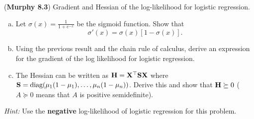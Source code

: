 \documentclass[12pt,letterpaper]{hmcpset}
\begin{document}
\begin{problem}[1]
	(\textbf{Murphy 8.3}) Gradient and Hessian of the log-likelihood for
	logistic regression.
	\begin{enumerate}[(a)]
		\item Let $\sigma(x) = \frac{1}{1 + e^{-x}}$ be the sigmoid function. Show that
		\[
		\sigma'(x) = \sigma(x)\left[1 - \sigma(x)\right].
		\]
		\item Using the previous result and the chain rule of calculus, derive an
		expression for the gradient of the log likelihood for logistic regression.
		\item The Hessian can be written as ${\bf H}={\bf X}^\top{\bf S}{\bf X}$ where ${\bf S} =
		{\hbox{diag}}(\mu_1(1-\mu_1), \dots, \mu_n(1-\mu_n))$. Derive this and show that
		${\bf H} \succeq 0$ ($A \succeq 0$ means that $A$ is positive semidefinite).\\
	\end{enumerate} 

\textit{Hint:} Use the \textbf{negative} log-likelihood of logistic regression for this problem.
\end{problem}
\end{document}
